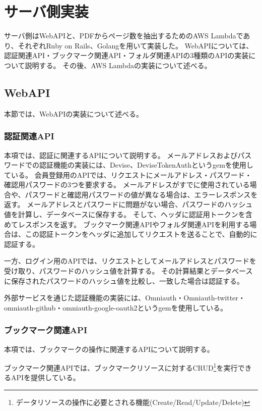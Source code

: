 \section{サーバ側実装}
サーバ側はWebAPIと、PDFからページ数を抽出するためのAWS Lambdaであり、それぞれRuby on Rails、Golangを用いて実装した。
WebAPIについては、認証関連API・ブックマーク関連API・フォルダ関連APIの3種類のAPIの実装について説明する。
その後、AWS Lambdaの実装について述べる。

\subsection{WebAPI}
本節では、WebAPIの実装について述べる。

\subsubsection{認証関連API}
本項では、認証に関連するAPIについて説明する。
メールアドレスおよびパスワードでの認証機能の実装には、Devise\cite{}、DeviseTokenAuth\cite{}というgemを使用している。
会員登録用のAPIでは、リクエストにメールアドレス・パスワード・確認用パスワードの3つを要求する。
メールアドレスがすでに使用されている場合や、パスワードと確認用パスワードの値が異なる場合は、エラーレスポンスを返す。
メールアドレスとパスワードに問題がない場合、パスワードのハッシュ値を計算し、データベースに保存する。
そして、ヘッダに認証用トークンを含めてレスポンスを返す。
ブックマーク関連APIやフォルダ関連APIを利用する場合は、この認証トークンをヘッダに追加してリクエストを送ることで、自動的に認証する。

一方、ログイン用のAPIでは、リクエストとしてメールアドレスとパスワードを受け取り、パスワードのハッシュ値を計算する。
その計算結果とデータベースに保存されたパスワードのハッシュ値を比較し、一致した場合は認証する。

外部サービスを通じた認証機能の実装には、Omniauth\cite{}・Omniauth-twitter・omniauth-github・omniauth-google-oauth2というgemを使用している。

\subsubsection{ブックマーク関連API}
本項では、ブックマークの操作に関連するAPIについて説明する。


ブックマーク関連APIでは、ブックマークリソースに対するCRUD\footnote{データリソースの操作に必要とされる機能(Create/Read/Update/Delete)}を実行できるAPIを提供している。

